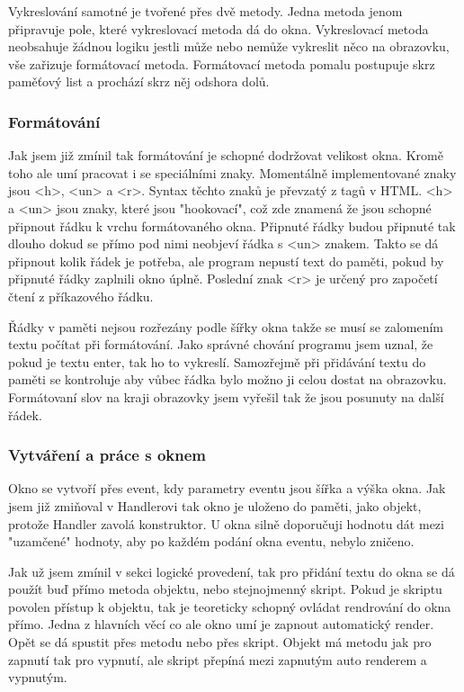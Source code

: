 \documentclass[12pt,a4paper]{article}
\begin{document}
Vykreslování samotné je tvořené přes dvě metody. Jedna metoda jenom připravuje pole, které vykreslovací metoda dá do okna. Vykreslovací metoda neobsahuje žádnou logiku jestli může nebo nemůže vykreslit něco na obrazovku, vše zařizuje formátovací metoda.
Formátovací metoda pomalu postupuje skrz paměťový list a prochází skrz něj odshora dolů.
\subsubsection{Formátování}
Jak jsem již zmínil tak formátování je schopné dodržovat velikost okna. Kromě toho ale umí pracovat i se speciálními znaky. Momentálně implementované znaky jsou <h>, <un> a <r>. Syntax těchto znaků je převzatý z tagů v HTML. <h> a <un> jsou znaky, které jsou "hookovací", což zde znamená že jsou schopné připnout řádku k vrchu formátovaného okna. Připnuté řádky budou připnuté tak dlouho dokud se přímo pod nimi neobjeví řádka s <un> znakem. Takto se dá připnout kolik řádek je potřeba, ale program nepustí text do paměti, pokud by připnuté řádky zaplnili okno úplně. Poslední znak <r> je určený pro započetí čtení z příkazového řádku.

Řádky v paměti nejsou rozřezány podle šířky okna takže se musí se zalomením textu počítat při formátování. Jako správné chování programu jsem uznal, že pokud je textu enter, tak ho to vykreslí. Samozřejmě při přidávání textu do paměti se kontroluje aby vůbec řádka bylo možno ji celou dostat na obrazovku. Formátovaní slov na kraji obrazovky jsem vyřešil tak že jsou posunuty na další řádek.
\subsubsection{Vytváření a práce s oknem}
Okno se vytvoří přes event, kdy parametry eventu jsou šířka a výška okna. Jak jsem již zmiňoval v Handlerovi tak okno je uloženo do paměti, jako objekt, protože Handler zavolá konstruktor. U okna silně doporučuji hodnotu dát mezi "uzamčené" hodnoty, aby po každém podání okna eventu, nebylo zničeno.

Jak už jsem zmínil v sekci logické provedení, tak pro přidání textu do okna se dá použít buď přímo metoda objektu, nebo stejnojmenný skript. Pokud je skriptu povolen přístup k objektu, tak je teoreticky schopný ovládat rendrování do okna přímo. Jedna z hlavních věcí co ale okno umí je zapnout automatický render. Opět se dá spustit přes metodu nebo přes skript. Objekt má metodu jak pro zapnutí tak pro vypnutí, ale skript přepíná mezi zapnutým auto renderem a vypnutým. 
\end{document}
